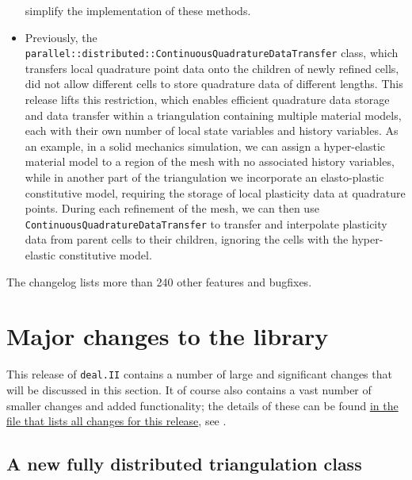 \documentclass{ansarticle-preprint}
\newcommand{\specialword}[1]{\texttt{#1}}
\newcommand{\dealii}{{\specialword{deal.II}}\xspace}
\begin{document}
\begin{itemize}
        simplify the implementation of these methods.
  \item Previously, the \texttt{parallel::distributed::ContinuousQuadratureDataTransfer}
        class, which transfers local quadrature point data onto the
        children of newly refined cells, did not allow different cells
        to store quadrature data of different lengths. This release lifts
        this restriction, which enables efficient quadrature data storage and data
        transfer within a triangulation containing multiple material models, each with
        their own number of local state variables and history variables.
        As an example, in a solid mechanics simulation, we can assign a hyper-elastic
        material model to a region of the mesh with no associated
        history variables, while in another part of the triangulation we incorporate an
        elasto-plastic constitutive model, requiring the storage of local plasticity
        data at quadrature points.
        During each refinement of the mesh, we can then use
        \texttt{ContinuousQuadratureDataTransfer} to transfer and interpolate
        plasticity data from parent cells to their children, ignoring the cells
        with the hyper-elastic constitutive model.
\end{itemize}
%
The changelog lists more than 240 other
features and bugfixes.




\section{Major changes to the library}
\label{sec:major}

This release of \dealii{} contains a number of large and significant changes
that will be discussed in this section.
It of course also contains a
vast number of smaller changes and added functionality; the details of these
can be found
\href{https://dealii.org/developer/doxygen/deal.II/changes_between_9_1_1_and_9_2_0.html}{
  in the file that lists all changes for this release}, see \cite{changes92}.


\subsection{A new fully distributed triangulation class}
\label{subsec:pft}
\end{document}
